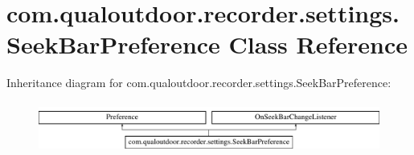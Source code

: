 \hypertarget{classcom_1_1qualoutdoor_1_1recorder_1_1settings_1_1SeekBarPreference}{\section{com.\-qualoutdoor.\-recorder.\-settings.\-Seek\-Bar\-Preference Class Reference}
\label{classcom_1_1qualoutdoor_1_1recorder_1_1settings_1_1SeekBarPreference}
}
Inheritance diagram for com.\-qualoutdoor.\-recorder.\-settings.\-Seek\-Bar\-Preference\-:\begin{figure}[H]
\begin{center}
\leavevmode
\includegraphics[height=1.702128cm]{classcom_1_1qualoutdoor_1_1recorder_1_1settings_1_1SeekBarPreference}
\end{center}
\end{figure}

